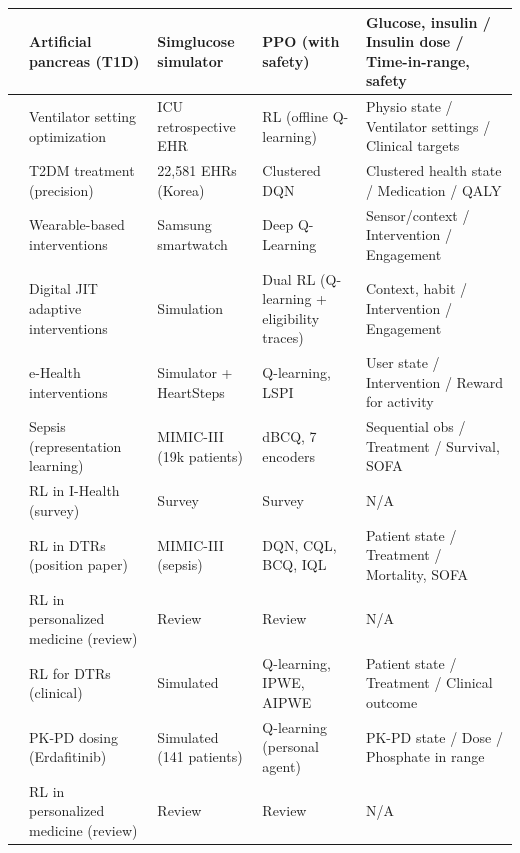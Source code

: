 \begin{longtable}{|p{1cm}|p{2.5cm}|p{2.5cm}|p{2.5cm}|p{3cm}|}
\hline
\cite{zhaoSafeenhancedFullyClosedloop2025} & Artificial pancreas (T1D) & Simglucose simulator & PPO (with safety) & Glucose, insulin / Insulin dose / Time-in-range, safety  \\
\hline
\cite{liuReinforcementLearningOptimize2024} & Ventilator setting optimization & ICU retrospective EHR & RL (offline Q-learning) & Physio state / Ventilator settings / Clinical targets \\
\hline
\cite{ohEffectiveDatadrivenPrecision2022} & T2DM treatment (precision) & 22,581 EHRs (Korea) & Clustered DQN & Clustered health state / Medication / QALY \\
\hline
\cite{tripathyReinforcementLearningOptimizing2024} & Wearable-based interventions & Samsung smartwatch & Deep Q-Learning & Sensor/context / Intervention / Engagement \\
\hline
\cite{gonulReinforcementLearningBased2021} & Digital JIT adaptive interventions & Simulation & Dual RL (Q-learning + eligibility traces) & Context, habit / Intervention / Engagement \\
\hline
\cite{hassouniClusteringbasedReinforcementLearning2020} & e-Health interventions & Simulator + HeartSteps & Q-learning, LSPI & User state / Intervention / Reward for activity \\
\hline
\cite{killianEmpiricalStudyRepresentation2020} & Sepsis (representation learning) & MIMIC-III (19k patients) & dBCQ, 7 encoders & Sequential obs / Treatment / Survival, SOFA \\
\hline
\cite{abdellatifReinforcementLearningIntelligent2021} & RL in I-Health (survey) & Survey & Survey & N/A  \\
\hline
\cite{luoReinforcementLearningDynamic2024} & RL in DTRs (position paper) & MIMIC-III (sepsis) & DQN, CQL, BCQ, IQL & Patient state / Treatment / Mortality, SOFA \\
\hline
\cite{banumathiReinforcementLearningPersonalized2025} & RL in personalized medicine (review) & Review & Review & N/A \\
\hline
\cite{zhangReinforcementLearningClinical2019} & RL for DTRs (clinical) & Simulated & Q-learning, IPWE, AIPWE & Patient state / Treatment / Clinical outcome  \\
\hline
\cite{decarloReinforcementLearningPKPD2024} & PK-PD dosing (Erdafitinib) & Simulated (141 patients) & Q-learning (personal agent) & PK-PD state / Dose / Phosphate in range \\
\hline
\cite{banumathiReinforcementLearningPersonalized2025a} & RL in personalized medicine (review) & Review & Review & N/A \\

\end{longtable}
